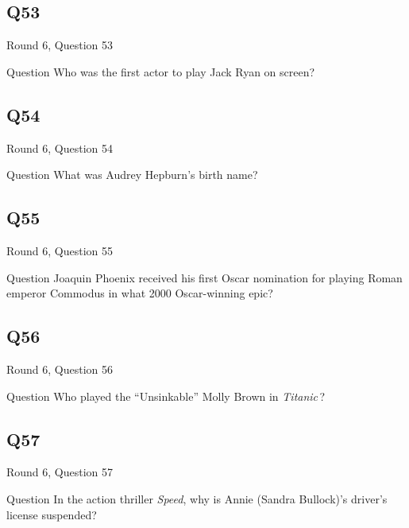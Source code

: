 \documentclass[11pt]{beamer}
\begin{document}
\subsection*{Q53}
\begin{frame}[t]{Round 6, Question 53}
  \vspace{2em}
  \begin{block}{Question}
    Who was the first actor to play Jack Ryan on screen?
  \end{block}
\end{frame}


\subsection*{Q54}
\begin{frame}[t]{Round 6, Question 54}
  \vspace{2em}
  \begin{block}{Question}
    What was Audrey Hepburn's birth name?
  \end{block}
\end{frame}


\subsection*{Q55}
\begin{frame}[t]{Round 6, Question 55}
  \vspace{2em}
  \begin{block}{Question}
    Joaquin Phoenix received his first Oscar nomination for playing Roman emperor Commodus in what 2000 Oscar-winning epic?
  \end{block}
\end{frame}


\subsection*{Q56}
\begin{frame}[t]{Round 6, Question 56}
  \vspace{2em}
  \begin{block}{Question}
    Who played the ``Unsinkable'' Molly Brown in \emph{Titanic}\,?
  \end{block}
\end{frame}


\subsection*{Q57}
\begin{frame}[t]{Round 6, Question 57}
  \vspace{2em}
  \begin{block}{Question}
    In the action thriller \emph{Speed}, why is Annie (Sandra Bullock)'s driver's license suspended?
  \end{block}
\end{frame}
\end{document}
